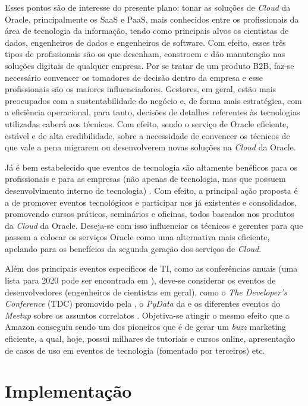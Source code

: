 \documentclass[a4paper]{article}
\begin{document}
Esses pontos são de interesse do presente plano: tonar as soluções de \emph{Cloud} da Oracle, principalmente os SaaS e PaaS, mais conhecidos entre os profissionais da área de tecnologia da informação, tendo como principais alvos os cientistas de dados, engenheiros de dados e engenheiros de software. Com efeito, esses três tipos de profissionais são os que desenham, constroem e dão manutenção nas soluções digitais de qualquer empresa. Por se tratar de um produto B2B, faz-se necessário convencer os tomadores de decisão dentro da empresa e esse profissionais são os maiores influenciadores. Gestores, em geral, estão mais preocupados com a sustentabilidade do negócio e, de forma mais estratégica, com a eficiência operacional, para tanto, decisões de detalhes referentes às tecnologias utilizadas caberá aos técnicos. Com efeito, sendo o serviço de Oracle eficiente, estável e de alta credibilidade, sobre a necessidade de convencer os técnicos de que vale a pena migrarem ou desenvolverem novas soluções na \emph{Cloud} da Oracle.

Já é bem estabelecido que eventos de tecnologia são altamente benéficos para os profissionais \cite{10Reason10:online} e para as empresas (não apenas de tecnologia, mas que possuem desenvolvimento interno de tecnologia) \cite{5keybene63:online}. Com efeito, a principal ação proposta é a de promover eventos tecnológicos e participar nos já existentes e consolidados, promovendo cursos práticos, seminários e oficinas, todos baseados nos produtos da \emph{Cloud} da Oracle. Deseja-se com isso influenciar os técnicos e gerentes para que passem a colocar os serviços Oracle como uma alternativa mais eficiente, apelando para os benefícios da segunda geração dos serviços de \emph{Cloud}.

Além dos principais eventos específicos de TI, como as conferências anuais (uma lista para 2020 pode ser encontrada em ), deve-se considerar os eventos de desenvolvedores (engenheiros de cientistas em geral), como o \emph{The Developer's Conference} (TDC) promovido pela , o \emph{PyData} da  e os diferentes eventos do \emph{Meetup} sobre os assuntos correlatos \cite{Meetup:online}. Objetiva-se atingir o mesmo efeito que a Amazon conseguiu sendo um dos pioneiros que é de gerar um \emph{buzz} marketing eficiente, a qual, hoje, possui milhares de tutoriais e cursos online, apresentação de casos de uso em eventos de tecnologia (fomentado por terceiros) etc.


\section{Implementação}
\end{document}
